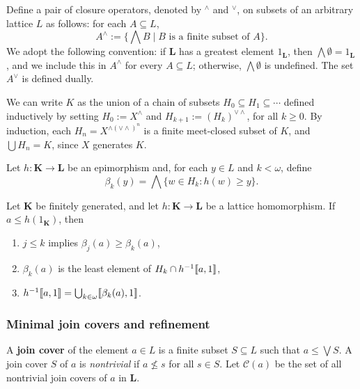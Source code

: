 Define a pair of closure operators, 
denoted by $^\wedge$ and $^\vee$, on  subsets of an arbitrary 
lattice %
$L$ as follows: for each $A\subseteq L$,
\[
A^\wedge := \{\bigwedge B \mid B \text{ is a finite subset of } A\}.
\]
We adopt the following convention: if 
$\mathbf L$ has a greatest element 
$1_{\mathbf L}$, then $\bigwedge \emptyset = 1_{\mathbf L}$, and we include 
this in $A^\wedge$ for every $A \subseteq L$; otherwise, $\bigwedge \emptyset$ is undefined.  
The set $A^\vee$ is defined dually.

We can write $K$ as the union of a chain of subsets 
$H_0\subseteq H_1 \subseteq \cdots$ defined inductively by setting 
$H_0 := X^\wedge$ and $H_{k+1} := (H_k)^{\vee \wedge}$, for all $k\geqslant 0$. 
By induction, each $H_n = X^{\wedge(\vee\wedge)^n}$ is a finite meet-closed 
subset of $K$, and $\bigcup H_n = K$, since $X$  generates $K$.

Let $h \colon \mathbf K \to \mathbf L$ be an epimorphism and, 
for each $y \in L$ and $k< \omega$, define
\[
\beta_k(y) = \bigwedge \{w \in H_k : h(w) \geqslant y\}.
\]

\begin{theorem}\label{thm:2.2}
   Let $\mathbf K$ be finitely generated, and let $h \colon \mathbf K \to \mathbf L$ be a lattice
  homomorphism. If $a \leq h(1_{\mathbf K})$, then
\begin{enumerate}
\item $j \leq k$ implies $\beta_j(a) \geq \beta_k(a)$,
\item  $\beta_k(a)$ is the least element of $H_k \cap h^{-1}\llbracket a, 1 \rrbracket$,
\item  $h^{-1}\llbracket a, 1 \rrbracket = \bigcup_{k\in \omega}\llbracket \beta_k(a), 1 \rrbracket$.
\end{enumerate}  

\end{theorem}  


\subsubsection{Minimal join covers and refinement}

A \textbf{join cover} of the element $a \in L$ is a finite
subset $S \subseteq L$ such that $a \leq \bigvee S$. 
A join cover $S$ of $a$ is \textit{nontrivial} if $a \nleq s$ for all
$s \in S$. Let $\mathcal C (a)$ be the set of all nontrivial join 
covers of $a$ in $\mathbf L$.

